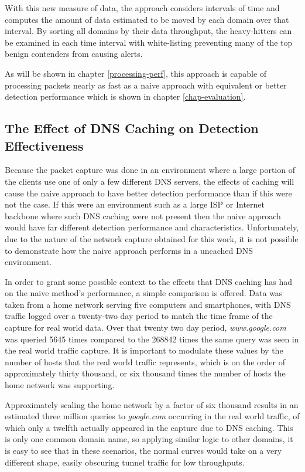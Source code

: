 \documentclass[12pt]{report}
\theoremstyle{remark}
\theoremstyle{definition}
\theoremstyle{definition}
\theoremstyle{definition}
\begin{document}
With this new measure of data, the approach considers intervals of time and
computes the amount of data estimated to be moved by each domain over that
interval. By sorting all domains by their data throughput, the heavy-hitters can
be examined in each time interval with white-listing preventing many of the top benign
contenders from causing alerts.

As will be shown in chapter \ref{processing-perf}, this approach is capable of
processing packets nearly as fast as a naive approach with equivalent or better
detection performance which is shown in chapter \ref{chap-evaluation}.

\subsection{The Effect of DNS Caching on Detection Effectiveness}
\label{dns-caching}

Because the packet capture was done in an environment where a large portion of
the clients use one of only a few different DNS servers, the effects of caching
will cause the naive approach to have better detection performance than if this
were not the case. If this were an environment such as a large ISP or Internet
backbone where such DNS caching were not present then the naive approach would have
far different detection performance and characteristics. Unfortunately, due to
the nature of the network capture obtained for this work, it is not possible to
demonstrate how the naive approach performs in a uncached DNS environment.

In order to grant some possible context to the effects that DNS caching has had
on the naive method's performance, a simple comparison is offered. Data was
taken from a home network serving five computers and smartphones, with DNS
traffic logged over a twenty-two day period to match the time frame of the
capture for real world data. Over that twenty two day period,
\emph{www.google.com} was queried 5645 times compared to the 268842 times the
same query was seen in the real world traffic capture. It is important to modulate these
values by the number of hosts that the real world traffic represents, which
is on the order of approximately thirty thousand, or six thousand times the
number of hosts the home network was supporting.

Approximately scaling the home network by a factor of six thousand results in an
estimated three million queries to \emph{google.com} occurring in the real world
traffic, of which only a twelfth actually appeared in the capture due to
DNS caching. This is only one common domain name, so applying similar logic to
other domains, it is easy to see that in these scenarios, the normal curves
would take on a very different shape, easily obscuring tunnel traffic for low
throughputs.
\end{document}

